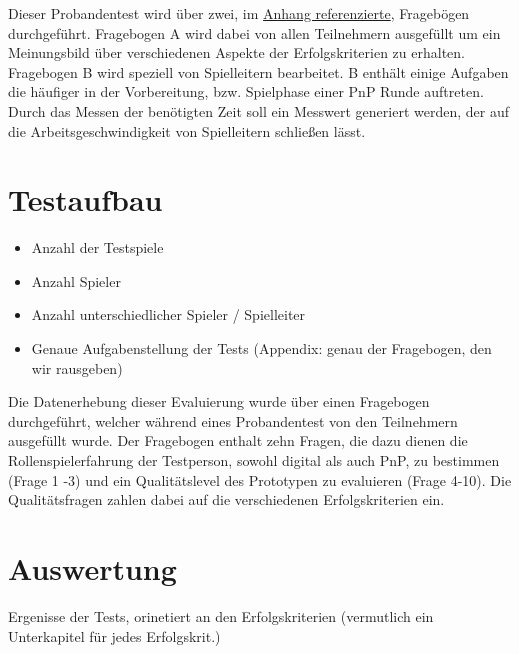 Dieser Probandentest wird über zwei, im \hyperref[sec:frageboegen]{Anhang referenzierte}, Fragebögen durchgeführt. Fragebogen A wird dabei von allen Teilnehmern ausgefüllt um ein Meinungsbild über verschiedenen Aspekte der Erfolgskriterien zu erhalten. Fragebogen B wird speziell von Spielleitern bearbeitet. B enthält einige Aufgaben die häufiger in der Vorbereitung, bzw. Spielphase einer PnP Runde auftreten. Durch das Messen der benötigten Zeit soll ein Messwert generiert werden, der auf die Arbeitsgeschwindigkeit von Spielleitern schließen lässt.
  



\section{Testaufbau}
\label{sec:Testaufbau}
\begin{itemize}
	\item Anzahl der Testspiele
	\item Anzahl Spieler
	\item Anzahl unterschiedlicher Spieler / Spielleiter
	\item Genaue Aufgabenstellung der Tests (Appendix: genau der Fragebogen, den wir rausgeben)
\end{itemize}
Die Datenerhebung dieser Evaluierung wurde über einen Fragebogen durchgeführt, welcher während eines Probandentest von den Teilnehmern ausgefüllt wurde. Der Fragebogen enthalt zehn Fragen, die dazu dienen die Rollenspielerfahrung der Testperson, sowohl digital als auch PnP, zu bestimmen (Frage 1 -3) und ein Qualitätslevel des Prototypen zu evaluieren (Frage 4-10). Die Qualitätsfragen zahlen dabei auf die verschiedenen Erfolgskriterien ein. 



\section{Auswertung}
\label{sec:Auswertung}
Ergenisse der Tests, orinetiert an den Erfolgskriterien (vermutlich ein Unterkapitel für jedes Erfolgskrit.)